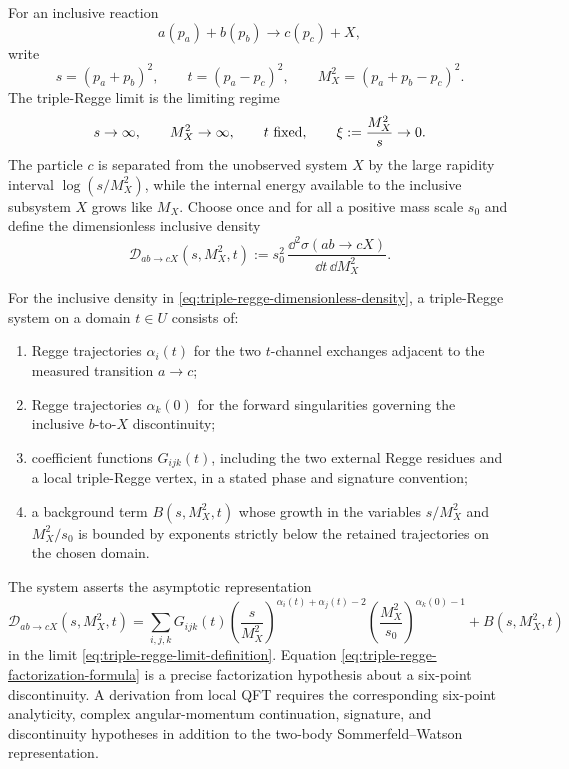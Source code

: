 \begin{definition}
\label{def:inclusive-triple-regge-kinematics}
For an inclusive reaction
\[
  a(p_a)+b(p_b)\longrightarrow c(p_c)+X,
\]
write
\[
  s=(p_a+p_b)^2,\qquad
  t=(p_a-p_c)^2,\qquad
  M_X^2=(p_a+p_b-p_c)^2 .
\]
The triple-Regge limit is the limiting regime
\begin{equation}
  s\to\infty,\qquad
  M_X^2\to\infty,\qquad
  t\ {\rm fixed},\qquad
  \xi:=\frac{M_X^2}{s}\to0.
  \label{eq:triple-regge-limit-definition}
\end{equation}
The particle \(c\) is separated from the unobserved system \(X\) by the large
rapidity interval \(\log(s/M_X^2)\), while the internal energy available to
the inclusive subsystem \(X\) grows like \(M_X\).  Choose once and for all a
positive mass scale \(s_0\) and define the dimensionless inclusive density
\begin{equation}
  \mathcal D_{a b\to c X}(s,M_X^2,t)
  :=
  s_0^2\,\frac{\dd^2\sigma(a b\to c X)}{\dd t\,\dd M_X^2}.
  \label{eq:triple-regge-dimensionless-density}
\end{equation}
\end{definition}

\begin{hypothesis}
\label{hyp:triple-regge-factorization-system}
For the inclusive density in
\eqref{eq:triple-regge-dimensionless-density}, a triple-Regge system on a
domain \(t\in U\) consists of:
\begin{enumerate}
  \item Regge trajectories \(\alpha_i(t)\) for the two \(t\)-channel
  exchanges adjacent to the measured transition \(a\to c\);
  \item Regge trajectories \(\alpha_k(0)\) for the forward singularities
  governing the inclusive \(b\)-to-\(X\) discontinuity;
  \item coefficient functions \(G_{ijk}(t)\), including the two external
  Regge residues and a local triple-Regge vertex, in a stated phase and
  signature convention;
  \item a background term \(B(s,M_X^2,t)\) whose growth in the variables
  \(s/M_X^2\) and \(M_X^2/s_0\) is bounded by exponents strictly below the
  retained trajectories on the chosen domain.
\end{enumerate}
The system asserts the asymptotic representation
\begin{equation}
  \mathcal D_{a b\to c X}(s,M_X^2,t)
  =
  \sum_{i,j,k}
  G_{ijk}(t)
  \left(\frac{s}{M_X^2}\right)^{\alpha_i(t)+\alpha_j(t)-2}
  \left(\frac{M_X^2}{s_0}\right)^{\alpha_k(0)-1}
  +B(s,M_X^2,t)
  \label{eq:triple-regge-factorization-formula}
\end{equation}
in the limit \eqref{eq:triple-regge-limit-definition}.  Equation
\eqref{eq:triple-regge-factorization-formula} is a precise factorization
hypothesis about a six-point discontinuity.  A derivation from local QFT
requires the corresponding six-point analyticity, complex angular-momentum
continuation, signature, and discontinuity hypotheses in addition to the
two-body Sommerfeld--Watson representation.
\end{hypothesis}

